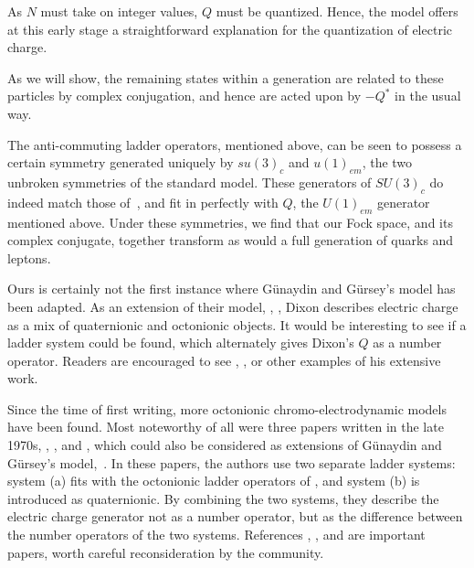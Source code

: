 \documentclass[letterpaper,12pt,titlepage,oneside,final]{book}
\begin{document}
\noindent  As $N$ must take on integer values, $Q$ must be quantized.  Hence, the model offers at this early stage a straightforward explanation for the quantization of electric charge.

As we will show, the remaining states within a generation are related to these particles by complex conjugation, and hence are acted upon by $-Q^*$ in the usual way. 

The anti-commuting ladder operators, mentioned above, can be seen to possess a certain symmetry generated uniquely by $su(3)_c$ and $u(1)_{em}$, the two unbroken symmetries of the standard model.  These generators of $SU(3)_c$ do indeed match those of~\cite{GGquarks}, and fit in perfectly with $Q$, the $U(1)_{em}$ generator mentioned above.  Under these symmetries, we find that our Fock space, and its complex conjugate, together transform as would a full generation of quarks and leptons.


Ours is certainly not the first instance where G\"{u}naydin and G\"{u}rsey's model has been adapted.  As an extension of their model, \cite{dixon}, \cite{matter}, Dixon describes electric charge  as a mix of quaternionic and octonionic objects.    It would be interesting to see if a ladder system could be found, which alternately gives Dixon's $Q$ as a number operator.   Readers are encouraged to see \cite{dixon}, \cite{matter}, or other examples of his extensive work.

Since the time of first writing, more octonionic chromo-electrodynamic models have been found.  Most noteworthy of all were three papers written in the late 1970s, \cite{Grass}, \cite{wow}, and \cite{wowagain}, which could also be considered as extensions of G\"{u}naydin and G\"{u}rsey's model,~\cite{GGstats}.  In these papers, the authors use two separate ladder systems:  system (a) fits with the octonionic ladder operators of \cite{GGstats}, and system (b) is introduced as quaternionic.  By combining the two systems, they describe the electric charge generator not as a number operator, but as the difference  between the number operators of the two systems.  References \cite{Grass}, \cite{wow}, and \cite{wowagain} are important papers, worth careful reconsideration by the community. 

\end{document}
